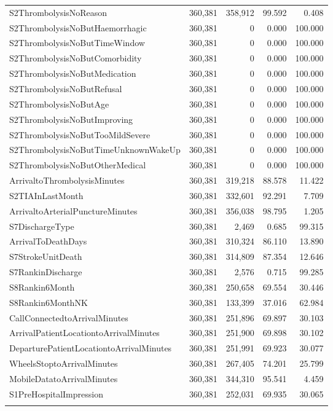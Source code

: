 \begin{longtable}{lrrrr}
S2ThrombolysisNoReason & 360,381 & 358,912 & 99.592 & 0.408 \\
S2ThrombolysisNoButHaemorrhagic & 360,381 & 0 & 0.000 & 100.000 \\
S2ThrombolysisNoButTimeWindow & 360,381 & 0 & 0.000 & 100.000 \\
S2ThrombolysisNoButComorbidity & 360,381 & 0 & 0.000 & 100.000 \\
S2ThrombolysisNoButMedication & 360,381 & 0 & 0.000 & 100.000 \\
S2ThrombolysisNoButRefusal & 360,381 & 0 & 0.000 & 100.000 \\
S2ThrombolysisNoButAge & 360,381 & 0 & 0.000 & 100.000 \\
S2ThrombolysisNoButImproving & 360,381 & 0 & 0.000 & 100.000 \\
S2ThrombolysisNoButTooMildSevere & 360,381 & 0 & 0.000 & 100.000 \\
S2ThrombolysisNoButTimeUnknownWakeUp & 360,381 & 0 & 0.000 & 100.000 \\
S2ThrombolysisNoButOtherMedical & 360,381 & 0 & 0.000 & 100.000 \\
ArrivaltoThrombolysisMinutes & 360,381 & 319,218 & 88.578 & 11.422 \\
S2TIAInLastMonth & 360,381 & 332,601 & 92.291 & 7.709 \\
ArrivaltoArterialPunctureMinutes & 360,381 & 356,038 & 98.795 & 1.205 \\
S7DischargeType & 360,381 & 2,469 & 0.685 & 99.315 \\
ArrivalToDeathDays & 360,381 & 310,324 & 86.110 & 13.890 \\
S7StrokeUnitDeath & 360,381 & 314,809 & 87.354 & 12.646 \\
S7RankinDischarge & 360,381 & 2,576 & 0.715 & 99.285 \\
S8Rankin6Month & 360,381 & 250,658 & 69.554 & 30.446 \\
S8Rankin6MonthNK & 360,381 & 133,399 & 37.016 & 62.984 \\
CallConnectedtoArrivalMinutes & 360,381 & 251,896 & 69.897 & 30.103 \\
ArrivalPatientLocationtoArrivalMinutes & 360,381 & 251,900 & 69.898 & 30.102 \\
DeparturePatientLocationtoArrivalMinutes & 360,381 & 251,991 & 69.923 & 30.077 \\
WheelsStoptoArrivalMinutes & 360,381 & 267,405 & 74.201 & 25.799 \\
MobileDatatoArrivalMinutes & 360,381 & 344,310 & 95.541 & 4.459 \\
S1PreHospitalImpression & 360,381 & 252,031 & 69.935 & 30.065 \\
\label{tab:missing_all}
\end{longtable}


